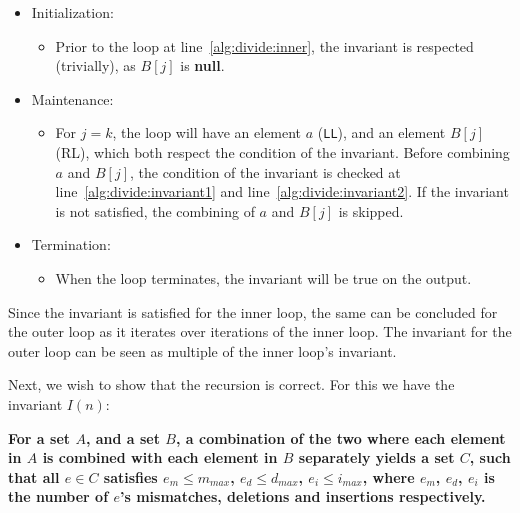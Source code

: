 \documentclass[12pt]{article}
\theoremstyle{definition}
\begin{document}
\begin{itemize}
\item Initialization:
\begin{itemize}
	\item[] Prior to the loop at line~\ref{alg:divide:inner}, the invariant is respected (trivially), as $B[j]$ is \textbf{null}.
\end{itemize}

\item Maintenance:
\begin{itemize}
	\item[] For $j = k$, the loop will have an element $a$ (\texttt{LL}), and an element $B[j]$ (RL), which both respect the condition of the invariant. Before combining $a$ and $B[j]$, the condition of the invariant is checked at line~\ref{alg:divide:invariant1} and line~\ref{alg:divide:invariant2}. If the invariant is not satisfied, the combining of $a$ and $B[j]$ is skipped.
\end{itemize}

\item Termination:
\begin{itemize}
	\item[] When the loop terminates, the invariant will be true on the output.
\end{itemize}
\end{itemize}

Since the invariant is satisfied for the inner loop, the same can be concluded for the outer loop as it iterates over iterations of the inner loop. The invariant for the outer loop can be seen as multiple of the inner loop's invariant.

Next, we wish to show that the recursion is correct. For this we have the invariant $I(n)$:

\textbf{For a set $A$, and a set $B$, a combination of the two where each element in $A$ is combined with each element in $B$ separately yields a set $C$, such that all $e \in C$ satisfies $e_m \leq m_{max}$, $e_d \leq d_{max}$, $e_i \leq i_{max}$, where $e_m$, $e_d$, $e_i$ is the number of $e$'s mismatches, deletions and insertions respectively.}
\end{document}
